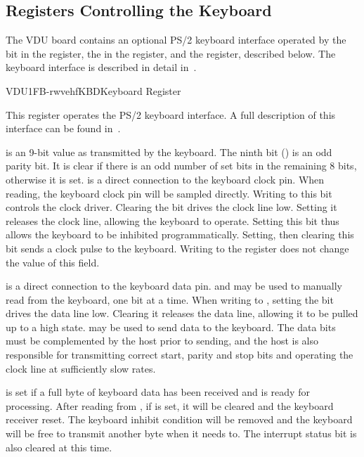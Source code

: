 \subsection{Registers Controlling the Keyboard}

The VDU board contains an optional PS/2 keyboard interface operated by the
 bit in the  register, the  in the 
register, and the  register, described below. The keyboard interface
is described in detail in~.

\begin{ioport}{VDU}{1FB}{-rwvehf}{KBD}{Keyboard Register}

  This register operates the PS/2 keyboard interface. A full description of
  this interface can be found in~.

  \begin{cbitfield}[8]
  \end{cbitfield}

  \begin{description}
     is an 9-bit value as transmitted by the
    keyboard. The ninth bit () is an odd parity bit. It is clear if
    there is an odd number of set bits in the remaining 8 bits, otherwise it is
    set.   is a direct connection to the keyboard clock
    pin. When reading, the keyboard clock pin will be sampled directly. Writing
    to this bit controls the clock driver. Clearing the bit drives the clock
    line low. Setting it releases the clock line, allowing the keyboard to
    operate. Setting this bit thus allows the keyboard to be inhibited
    programmatically. Setting, then clearing this bit sends a clock pulse to
    the keyboard. Writing to the  register does not change the value
    of this field.

     is a direct connection to the keyboard data pin. 
    and  may be used to manually read from the keyboard, one bit at a
    time. When writing to , setting the bit drives the data line
    low. Clearing it releases the data line, allowing it to be pulled up to a
    high state.  may be used to send data to the keyboard. The data
    bits must be complemented by the host prior to sending, and the host is
    also responsible for transmitting correct start, parity and stop bits and
    operating the clock line at sufficiently slow rates.

     is set if a full byte of keyboard data has been received
    and is ready for processing. After reading from , if 
    is set, it will be cleared and the keyboard receiver reset. The keyboard
    inhibit condition will be removed and the keyboard will be free to transmit
    another byte when it needs to. The interrupt status bit  is
    also cleared at this time.
  \end{description}
\end{ioport}





